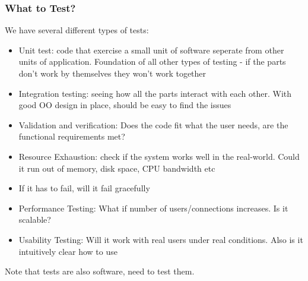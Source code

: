 \documentclass{article}
\begin{document}
\subsubsection*{What to Test?}
We have several different types of tests:
\begin{itemize}
    \item Unit test: code that exercise a small unit of software seperate from other units of application. Foundation of all other types of testing - if the parts don't work by themselves they won't work together
    \item Integration testing: seeing how all the parts interact with each other. With good OO design in place, should be easy to find the issues
    \item Validation and verification: Does the code fit what the user needs, are the functional requirements met?
    \item Resource Exhaustion: check if the system works well in the real-world. Could it run out of memory, disk space, CPU bandwidth etc
    \item If it has to fail, will it fail gracefully
    \item Performance Testing: What if number of users/connections increases. Is it scalable?
    \item Usability Testing: Will it work with real users under real conditions. Also is it intuitively clear how to use
\end{itemize}
Note that tests are also software, need to test them.
\end{document}
